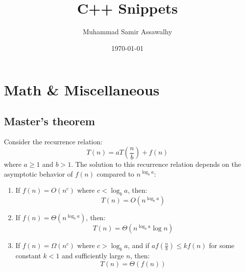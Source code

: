 \documentclass[14pt]{extarticle}
\title{\vspace{-4ex}\Large{C++ Snippets}}
\author{Muhammad Samir Assawalhy}
\date{\today}
\begin{document}
\maketitle
\vspace{-13ex}

\tableofcontents

\pagestyle{fancy}



\section{Math & Miscellaneous}

\subsection{Master's theorem}

Consider the recurrence relation:
\[
T(n) = a T\left(\frac{n}{b}\right) + f(n)
\]
where \( a \geq 1 \) and \( b > 1 \). The solution to this recurrence relation depends on the asymptotic behavior of \( f(n) \) compared to \( n^{\log_b a} \):

\begin{enumerate}
    \item If \( f(n) = O(n^c) \) where \( c < \log_b a \), then:
    \[
    T(n) = O(n^{\log_b a})
    \]
    \item If \( f(n) = \Theta(n^{\log_b a}) \), then:
    \[
    T(n) = \Theta(n^{\log_b a} \log n)
    \]
    \item If \( f(n) = \Omega(n^c) \) where \( c > \log_b a \), and if \( a f\left(\frac{n}{b}\right) \leq k f(n) \) for some constant \( k < 1 \) and sufficiently large \( n \), then:
    \[
    T(n) = \Theta(f(n))
    \]
\end{enumerate}
\end{document}
